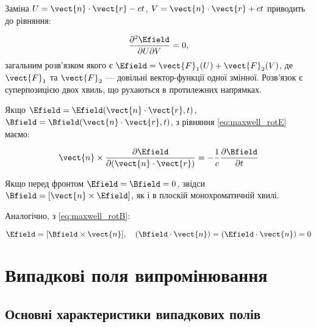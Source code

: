Заміна \(U = \vect{n} \cdot \vect{r} - ct\), \(V = \vect{n} \cdot \vect{r} + ct\) приводить до рівняння:

\begin{equation*}
\frac{\partial^2 \Efield}{\partial U \partial V} = 0,
\end{equation*}
загальним розв’язком якого є \(\Efield = \vect{F}_1(U) + \vect{F}_2(V)\), де \(\vect{F}_1\) та \(\vect{F}_2\) --- довільні вектор-функції одної
змінної. Розв’язок є суперпозицією двох хвиль, що рухаються в протилежних напрямках.

Якщо \(\Efield = \Efield(\vect{n} \cdot \vect{r}, t)\), \(\Bfield = \Bfield(\vect{n} \cdot \vect{r}, t)\), з рівняння \eqref{eq:maxwell_rotE} маємо:

\begin{equation*}
\vect{n} \times \frac{\partial \Efield}{\partial (\vect{n} \cdot \vect{r})} = -\frac{1}{c} \frac{\partial \Bfield}{\partial t}
\end{equation*}

Якщо перед фронтом \(\Efield = \Bfield = 0\), звідси \(\Bfield = [\vect{n} \times \Efield]\), як і в плоскій монохроматичній хвилі.

Аналогічно, з \eqref{eq:maxwell_rotB}:

\begin{equation*}
\Efield = [\Bfield \times \vect{n}], \quad (\Bfield \cdot \vect{n}) = (\Efield \cdot \vect{n}) = 0
\end{equation*}


\section{Випадкові поля випромінювання}

\subsection*{Основні характеристики випадкових полів}

